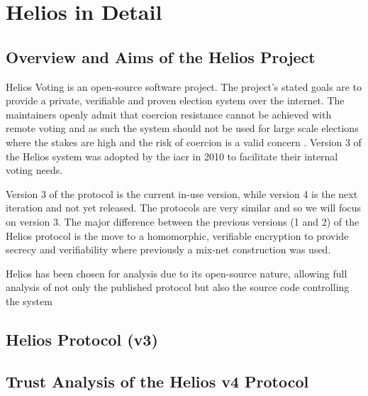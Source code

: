 
\chapter{Helios in Detail}
\label{ch:helios}

\section{Overview and Aims of the Helios Project}
\label{ch:helios:aims}

Helios Voting is an open-source software project. The project's stated goals are to provide a private, verifiable and proven election system over the internet. The maintainers openly admit that coercion resistance cannot be achieved with remote voting and as such the system should not be used for large scale elections where the stakes are high and the risk of coercion is a valid concern \cite{HeliosVotingFAQ}. Version 3 of the Helios system was adopted by the \gls{iacr} \cite{HeliosCryptographers2010} in 2010 to facilitate their internal voting needs.

Version 3 of the protocol is the current in-use version, while version 4 is the next iteration and not yet released. The protocols are very similar and so we will focus on version 3. The major difference between the previous versions (1 and 2) of the Helios protocol is the move to a homomorphic, verifiable encryption to provide secrecy and verifiability where previously a mix-net construction was used.

Helios has been chosen for analysis due to its open-source nature, allowing full analysis of not only the published protocol but also the source code controlling the system




\section{Helios Protocol (v3)}
\label{ch:helios:v3}




\section{Trust Analysis of the Helios v4 Protocol}
\label{ch:helios:trust}

